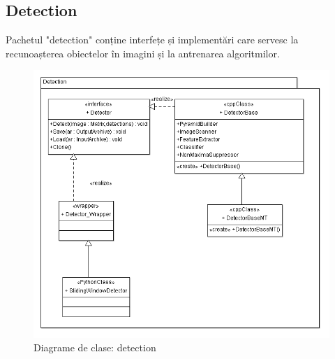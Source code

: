 \subsection{Detection}
Pachetul "detection" conține interfețe și implementări care servesc la recunoașterea obiectelor în imagini și la antrenarea algoritmilor.
\begin{figure}[H]
	\centering
		\includegraphics[width=1.00\textwidth]{uml/detectionClassDiagram.png}
	\caption{Diagrame de clase: detection}
	\label{fig:detectionClassDiagram}
\end{figure}
